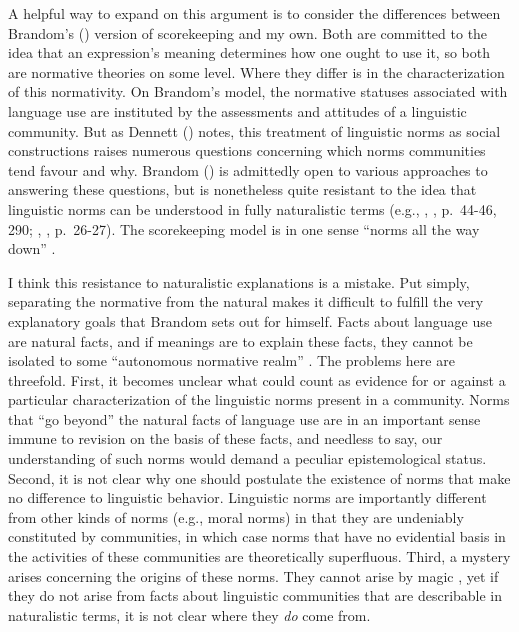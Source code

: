 A helpful way to expand on this argument is to consider the differences between Brandom's (\citeyear{Brandom:1994}) version of scorekeeping and my own. Both are committed to the idea that an expression's meaning determines how one ought to use it, so both are normative theories on some level. Where they differ is in the characterization of this normativity. On Brandom's model, the normative statuses associated with language use are instituted by the assessments and attitudes of a linguistic community. But as Dennett (\citeyear{Dennett:2010}) notes, this treatment of linguistic norms as social constructions raises numerous questions concerning which norms communities tend favour and why. Brandom (\citeyear{Brandom:2010}) is admittedly open to various approaches to answering these questions, but is nonetheless quite resistant to the idea that linguistic norms can be understood in fully naturalistic terms (e.g., \citeauthor{Brandom:1994}, \citeyear{Brandom:1994}, p.~44-46, 290; \citeauthor{Brandom:2000}, \citeyear{Brandom:2000}, p.~26-27). The scorekeeping model is in one sense ``norms all the way down'' \citep[][p. 44]{Brandom:1994}.

I think this resistance to naturalistic explanations is a mistake. Put simply, separating the normative from the natural makes it difficult to fulfill the very explanatory goals that Brandom sets out for himself. Facts about language use are natural facts, and if meanings are to explain these facts, they cannot be isolated to some ``autonomous normative realm'' \citep[][p. 133]{Horwich:2005}. The problems here are threefold. First, it becomes unclear what could count as evidence for or against a particular characterization of the linguistic norms present in a community. Norms that ``go beyond'' the natural facts of language use are in an important sense immune to revision on the basis of these facts, and needless to say, our understanding of such norms would demand a peculiar epistemological status. Second, it is not clear why one should postulate the existence of norms that make no difference to linguistic behavior. Linguistic norms are importantly different from other kinds of norms (e.g., moral norms) in that they are undeniably constituted by communities, in which case norms that have no evidential basis in the activities of these communities are theoretically superfluous. Third, a mystery arises concerning the origins of these norms. They cannot arise by magic \citep{Dennett:2010}, yet if they do not arise from facts about linguistic communities that are describable in naturalistic terms, it is not clear where they \textit{do} come from. 

